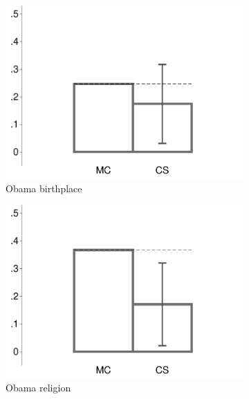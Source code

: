 \begin{figure}[t]
	\caption{Confidence Scoring vs. Other Survey Conditions (MTurk 1)}	
	\centering
	\begin{subfigure}{.325\textwidth}\centering
		\includegraphics[width=\textwidth]{../figs/confidence_score_birth_study1.pdf}
		\caption{Obama birthplace}
	\end{subfigure}
	\hfill
	\begin{subfigure}{.325\textwidth}\centering
		\includegraphics[width=\textwidth]{../figs/confidence_score_religion_study1.pdf}
		\caption{Obama religion}
	\end{subfigure}	
	\hfill
	\begin{subfigure}{.325\textwidth}\centering

\end{subfigure}
\end{figure}

